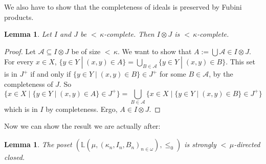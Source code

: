\documentclass[a4paper]{amsart}
\theoremstyle{definition}
\theoremstyle{remark}
\theoremstyle{plain}
\newtheorem{mylem}[mydef]{Lemma}
\numberwithin{mydef}{section}
\newcommand{\dL}{\mathbb{L}}
\begin{document}
	We also have to show that the completeness of ideals is preserved by Fubini products.
	
	\begin{mylem}\label{ProductComplete}
		Let $I$ and $J$ be ${<}\,\kappa$-complete. Then $I\otimes J$ is ${<}\,\kappa$-complete.
	\end{mylem}
	
	\begin{proof}
		Let $\mathcal{A}\subseteq I\otimes J$ be of size ${<}\,\kappa$. We want to show that $A:=\bigcup \mathcal{A}\in I\otimes J$. For every $x\in X$, $\{y\in Y\;|\;(x,y)\in A\}=\bigcup_{B\in\mathcal{A}}\{y\in Y\;|\;(x,y)\in B\}$. This set is in $J^+$ if and only if $\{y\in Y\;|\;(x,y)\in B\}\in J^+$ for some $B\in\mathcal{A}$, by the completeness of $J$. So
		$$\{x\in X\;|\;\{y\in Y\;|\;(x,y)\in A\}\in J^+\}=\bigcup_{B\in\mathcal{A}}\{x\in X\;|\;\{y\in Y\;|\;(x,y)\in B\}\in J^+\}$$
		which is in $I$ by completeness. Ergo, $A\in I\otimes J$.
	\end{proof}
	
	Now we can show the result we are actually after:
	
	\begin{mylem}\label{LClosure}
		The poset $(\dL(\mu,(\kappa_n,I_n,B_n)_{n\in\omega}),\leq_0)$ is strongly ${<}\,\mu$-directed closed.
	\end{mylem}
	
\end{document}
